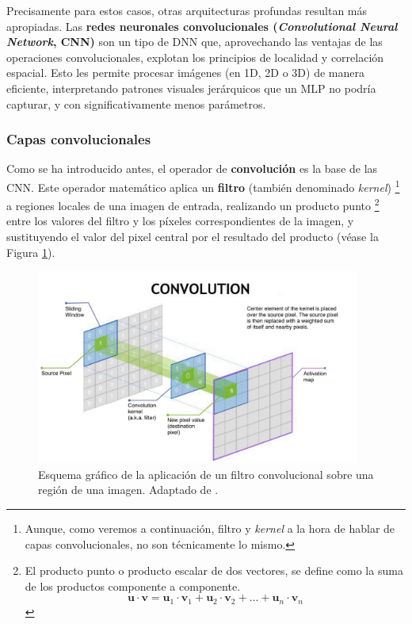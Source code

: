 Precisamente para estos casos, otras arquitecturas profundas resultan más apropiadas.
Las \textbf{redes neuronales convolucionales (\textit{Convolutional Neural Network}, \acrshort{CNN})} son un 
tipo de \acrshort{DNN} que, aprovechando las ventajas de las operaciones convolucionales, explotan los principios de localidad y correlación espacial. Esto les permite procesar imágenes (en 1D, 2D o 3D) de manera eficiente, interpretando patrones visuales jerárquicos que un \acrshort{MLP} no podría capturar, y con significativamente menos parámetros.


\subsubsection{Capas convolucionales}

Como se ha introducido antes, el operador de \textbf{convolución} es la base de las \acrshort{CNN}. Este operador 
matemático aplica un \textbf{filtro} (también denominado \textit{kernel})%
\footnote{
    Aunque, como veremos a continuación, filtro y \textit{kernel} a la hora de hablar de capas 
    convolucionales, no son técnicamente lo mismo.
} 
a regiones locales de una imagen de entrada, realizando un producto punto%
\footnote{
    El producto punto o producto escalar de dos vectores, se define como la suma de los productos componente a 
    componente. 
    $$
    \mathbf{u} \cdot \mathbf{v} = \mathbf{u}_1 \cdot \mathbf{v}_1 + \mathbf{u}_2 \cdot \mathbf{v}_2 + ... + 
    \mathbf{u}_n \cdot \mathbf{v}_n
    $$
} 
entre los valores del filtro y los píxeles correspondientes de la imagen, y sustituyendo el valor del pixel 
central por el resultado del producto (véase la Figura \ref{fig:conv_op}).

\begin{figure}[htbp]
    \centering
    \includegraphics[width=0.95\textwidth]{capitulos/cap_02/imagenes/convolution_operation.jpg}
    \caption[Esquema gráfico de la aplicación de un filtro convolucional sobre una región de una imagen.]{
        Esquema gráfico de la aplicación de un filtro convolucional sobre una región de una imagen.
        Adaptado de \cite{nvidia2025convolutionoperation}.
    } 
    \label{fig:conv_op}
\end{figure}

